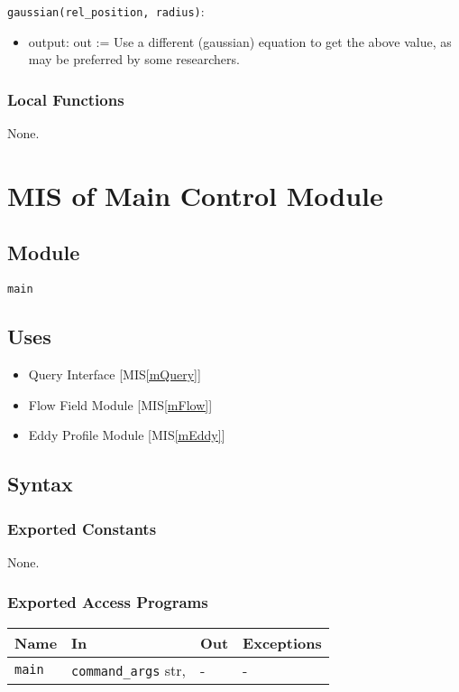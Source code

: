\documentclass[12pt, titlepage]{article}
\begin{document}
\noindent \texttt{gaussian(rel\_position, radius)}:
\begin{itemize}
  \item output: out := Use a different (gaussian) equation to get the above value, as may be preferred by some researchers.
\end{itemize}

\subsubsection{Local Functions}

None.


\newpage
\section{MIS of Main Control Module} \label{mMain} 

\subsection{Module}
\texttt{main}

\subsection{Uses}
\begin{itemize}
\item Query Interface [MIS\ref{mQuery}]
\item Flow Field Module [MIS\ref{mFlow}]
\item Eddy Profile Module [MIS\ref{mEddy}]
\end{itemize}

\subsection{Syntax}

\subsubsection{Exported Constants}
None.

\subsubsection{Exported Access Programs}

\begin{center}
\begin{tabular}{p{2cm} p{5.6cm} p{3cm} p{2cm}}
\hline
\textbf{Name} & \textbf{In} & \textbf{Out} & \textbf{Exceptions} \\
\hline
\texttt{main} & \texttt{command\_args} str, & - & - \\
\hline
\end{tabular}
\end{center}
\end{document}
